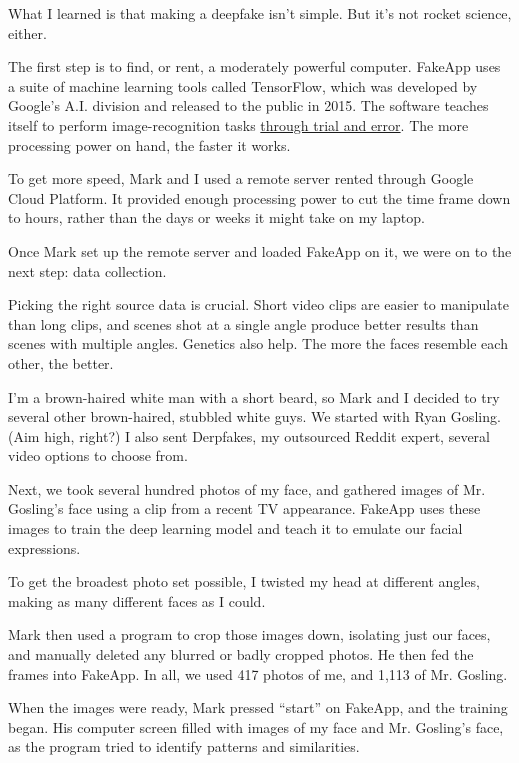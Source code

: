 What I learned is that making a deepfake isn't simple. But it's not
rocket science, either.

The first step is to find, or rent, a moderately powerful computer.
FakeApp uses a suite of machine learning tools called TensorFlow, which
was developed by Google's A.I. division and released to the public in
2015. The software teaches itself to perform image-recognition tasks
\href{https://www.nytimes.com/interactive/2018/01/02/technology/ai-generated-photos.html}{through
trial and error}. The more processing power on hand, the faster it
works.

To get more speed, Mark and I used a remote server rented through Google
Cloud Platform. It provided enough processing power to cut the time
frame down to hours, rather than the days or weeks it might take on my
laptop.

Once Mark set up the remote server and loaded FakeApp on it, we were on
to the next step: data collection.

Picking the right source data is crucial. Short video clips are easier
to manipulate than long clips, and scenes shot at a single angle produce
better results than scenes with multiple angles. Genetics also help. The
more the faces resemble each other, the better.

I'm a brown-haired white man with a short beard, so Mark and I decided
to try several other brown-haired, stubbled white guys. We started with
Ryan Gosling. (Aim high, right?) I also sent Derpfakes, my outsourced
Reddit expert, several video options to choose from.

Next, we took several hundred photos of my face, and gathered images of
Mr. Gosling's face using a clip from a recent TV appearance. FakeApp
uses these images to train the deep learning model and teach it to
emulate our facial expressions.

To get the broadest photo set possible, I twisted my head at different
angles, making as many different faces as I could.

Mark then used a program to crop those images down, isolating just our
faces, and manually deleted any blurred or badly cropped photos. He then
fed the frames into FakeApp. In all, we used 417 photos of me, and 1,113
of Mr. Gosling.

When the images were ready, Mark pressed ``start'' on FakeApp, and the
training began. His computer screen filled with images of my face and
Mr. Gosling's face, as the program tried to identify patterns and
similarities.

